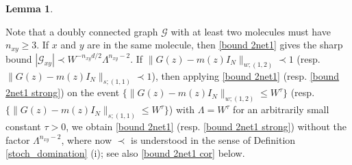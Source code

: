 \documentclass{article}
\newcommand{\1}{\mathds{1}}
\numberwithin{equation}{section}
\newcommand{\al}{\alpha}
\newcommand{\be}{\begin{equation}}
\newcommand{\ee}{\end{equation}}
\renewcommand{\cal}{\mathcal}
\newcommand{\ii}{\mathrm{i}} %
\renewcommand{\leq}{\leqslant}
\renewcommand{\geq}{\geqslant}
\renewcommand{\le}{\leq}
\renewcommand{\ge}{\geq}
\theoremstyle{plain} %
\newtheorem{lemma}[theorem]{Lemma}
\theoremstyle{remark}
\newcommand{\cor}{\color{red}}
\newcommand{\hty}[1]{{\cor (ht: #1) }}
\begin{document}
\begin{lemma}
 \end{lemma}

%

Note that a doubly connected graph $\cal G$ with at least two molecules must have $n_{xy}\ge 3$.  If $x$ and $y$ are in the same molecule, then \eqref{bound 2net1} gives the sharp bound $\left|\cal G_{xy}\right| \prec W^{ - n_{xy} d/2 }\Lambda^{n_{xy}-2}$. If $\|G(z)-m(z)I_N\|_{w;(1,2)}\prec 1$ (resp. $\|G(z)-m(z)I_N\|_{s;(1,1)}\prec 1$), then applying \eqref{bound 2net1} (resp. \eqref{bound 2net1 strong}) on the event $\{\|G(z)-m(z)I_N\|_{w;(1,2)}\le W^{\tau}\}$ (resp. $\{\|G(z)-m(z)I_N\|_{s;(1,1)}\le W^{\tau}\}$) with $\Lambda=W^\tau$ for an arbitrarily small constant $\tau>0$, we obtain \eqref{bound 2net1} (resp. \eqref{bound 2net1 strong}) without the factor $\Lambda^{n_{xy}-2}$, where now $\prec$ is understood in the sense of Definition \ref{stoch_domination} (i); see also \eqref{bound 2net1 cor} below.
\end{document}
